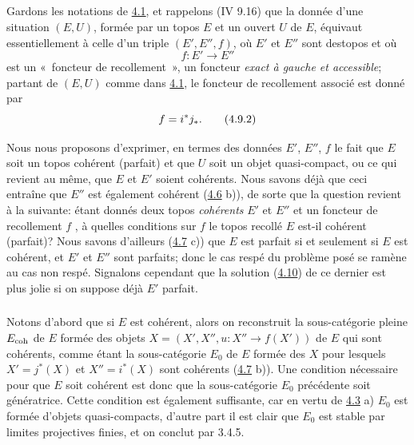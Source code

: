 \documentclass[10pt]{../fichiers-configuration-latex/smfart}
\begin{document}
\setcounter{subsection}{8}
\subsection{}
Gardons les notations de \hyperref[VI.subsec4.1]{4.1}, et rappelons (IV 9.16) que la donnée
d'une situation $(E, U)$, formée par un topos $E$ et un ouvert $U$ de
$E$, équivaut essentiellement à celle d'un triple $(E', E'', f)$, où
$E'$ et $E''$ sont des\pageoriginale topos et où
\begin{equation*}
f : E'\to E''\tag{4.9.1}
\end{equation*}
est un « foncteur de recollement », \ie un foncteur \emph{exact à
  gauche et accessible}; partant de $(E, U)$ comme dans \hyperref[VI.subsec4.1]{4.1}, le
  foncteur de recollement associé est donné par
\begin{equation*}
  f = i^{\ast} j_{\ast}{}.\tag{4.9.2}
\end{equation*}

Nous nous proposons d'exprimer, en termes des données $E'$, $E''$,
$f$ le fait que $E$ soit un topos cohérent (\resp parfait) et que
$U$ soit un objet quasi-compact, ou ce qui revient au même, que $E$
et $E'$ soient cohérents. Nous savons déjà que ceci entraîne
que $E''$ est également cohérent (\hyperref[VI.prop4.6]{4.6} b)), de sorte que
la question revient à la suivante: étant donnés deux topos
\emph{cohérents} $E'$ et $E''$ et un foncteur de recollement $f$
, à quelles conditions sur $f$ le topos recollé $E$
est-il cohérent (\resp parfait)? Nous savons d'ailleurs
(\hyperref[VI.cor4.7]{4.7} c)) que $E$ est parfait si et seulement si $E$ est
cohérent, et $E'$ et $E''$ sont parfaits; donc le cas respé du
problème posé se ramène au cas non respé. Signalons
cependant que la
solution (\hyperref[VI.prop4.10]{4.10}) de ce dernier est plus jolie si on
suppose déjà $E'$ parfait.

\setcounter{subsection}{9}
\setcounter{subsubsection}{2}
\subsubsection{}

Notons d'abord que si $E$ est cohérent, alors on reconstruit la
sous-catégorie pleine $E_{\mathrm{coh}}$ de $E$ formée des objets $X = (X',
X'', u : X''\to f(X'))$ de $E$ qui sont cohérents, comme étant la
sous-catégorie $E_{0}$ de $E$ formée des $X$ pour\pageoriginale
lesquels $X'= j^{\ast} (X)$ et $X''= i^{\ast}(X)$ sont cohérents
(\hyperref[VI.cor4.7]{4.7}
b)). Une condition nécessaire pour que $E$ soit cohérent est
donc que la
sous-catégorie $E_{0}$ précédente soit
génératrice. Cette condition
est également suffisante, car en vertu de \hyperref[VI.cor4.3]{4.3} a) $E_0$
est formée
d'objets quasi-compacts, d'autre part il est clair que $E_{0}$ est
stable par limites projectives finies, et on conclut
par 3.4.5.
\end{document}
